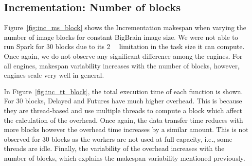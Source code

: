 \documentclass[conference]{IEEEtran}
\begin{document}
\subsection{Incrementation: Number of blocks}

Figure~\ref{fig:inc_ms_block} shows the Incrementation makespan when varying the
number of image blocks for constant BigBrain image size. We were not able to run
Spark for 30 blocks due to its \SI{2}{\giga\byte} limitation in the task size it can
compute. Once again, we do not observe any significant difference among the engines.
For all engines, makespan variability increases with the number of blocks, however,
engines scale very well in general.


In Figure~\ref{fig:inc_tt_block}, the total execution time of each function is shown.
For 30 blocks, Delayed and Futures have much higher overhead. This is because they are
thread-based and use multiple threads to compute a block which affect the calculation
of the overhead. Once again, the data transfer time reduces with more blocks however
the overhead time increases by a similar amount. This is not observed for 30 blocks
as the workers are not used at full capacity, i.e., some threads are idle. Finally,
the variability of the overhead increases with the number of blocks, which explains
the makespan variability mentioned previously.
\end{document}
